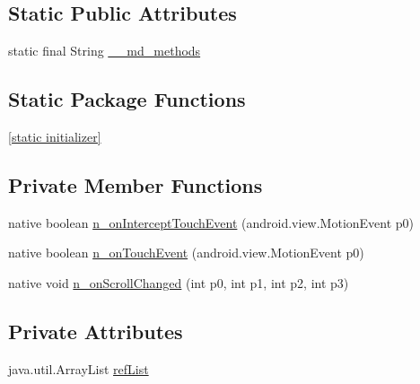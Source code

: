 \subsection*{Static Public Attributes}
\begin{CompactItemize}
\item 
static final String \hyperlink{classmd5b60ffeb829f638581ab2bb9b1a7f4f3f_1_1_a_horizontal_scroll_view_49c664fbcff063e605248e4205b9125b}{\_\-\_\-md\_\-methods}
\end{CompactItemize}
\subsection*{Static Package Functions}
\begin{CompactItemize}
\item 
\hyperlink{classmd5b60ffeb829f638581ab2bb9b1a7f4f3f_1_1_a_horizontal_scroll_view_d0ee475cb0a3b2ebb173bee6d7bacabb}{\mbox{[}static initializer\mbox{]}}
\end{CompactItemize}
\subsection*{Private Member Functions}
\begin{CompactItemize}
\item 
native boolean \hyperlink{classmd5b60ffeb829f638581ab2bb9b1a7f4f3f_1_1_a_horizontal_scroll_view_beb662d99b08cae3ef529bc96a067459}{n\_\-onInterceptTouchEvent} (android.view.MotionEvent p0)
\item 
native boolean \hyperlink{classmd5b60ffeb829f638581ab2bb9b1a7f4f3f_1_1_a_horizontal_scroll_view_de5ec2fc49cc6e86e26e3e2ce37f57e5}{n\_\-onTouchEvent} (android.view.MotionEvent p0)
\item 
native void \hyperlink{classmd5b60ffeb829f638581ab2bb9b1a7f4f3f_1_1_a_horizontal_scroll_view_4b46a558428eb6cb7b3ed5f20a7f091e}{n\_\-onScrollChanged} (int p0, int p1, int p2, int p3)
\end{CompactItemize}
\subsection*{Private Attributes}
\begin{CompactItemize}
\item 
java.util.ArrayList \hyperlink{classmd5b60ffeb829f638581ab2bb9b1a7f4f3f_1_1_a_horizontal_scroll_view_ceed0b3ec50f57c238e9674fd57c3c26}{refList}
\end{CompactItemize}


